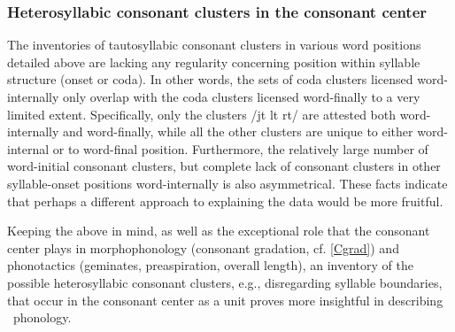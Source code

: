 \subsubsection[Heterosyllabic CCs in the consonant center]{Heterosyllabic consonant clusters in the consonant center}\label{consecutiveCs}
The inventories of tautosyllabic consonant clusters in various word positions detailed above are lacking any regularity concerning position within syllable structure (onset or coda). In other words, the sets of coda clusters licensed word-internally only overlap with the coda clusters licensed word-finally to a very limited extent. Specifically, only the clusters /jt lt rt/ are attested both word-internally and word-finally, while all the other clusters are unique to either word-internal or to word-final position. 
Furthermore, the relatively large number of word-initial consonant clusters, but complete lack of consonant clusters in other syllable-onset positions word-internally is also asymmetrical. 
These facts indicate that perhaps a different approach to explaining the data would be more fruitful. 

Keeping the above in mind, as well as the exceptional role that the consonant center plays in morphophonology (consonant gradation, cf. \SEC\ref{Cgrad}) and phonotactics (geminates, preaspiration, overall length), an inventory of the possible heterosyllabic consonant clusters, e.g., disregarding syllable boundaries, that occur in the consonant center as a unit proves more insightful in describing \PS\ phonology. 

